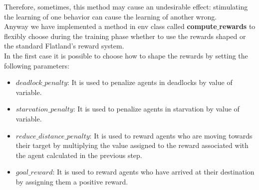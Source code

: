 Therefore, sometimes, this method may cause an undesirable effect: stimulating the learning of one behavior can cause the learning of another wrong. \\
Anyway we have implemented a method in env class called \textbf{compute$\_$rewards} to flexibly choose during the training phase whether to use the rewards shaped or the standard Flatland's reward system. \\
In the first case it is possible to choose how to shape the rewards by setting the following parameters:
\begin{itemize}
	\item\textbf{$deadlock\_penalty$}: It is used to penalize agents in deadlocks by value of variable.
	\item \textbf{$starvation\_penalty$}: It is used to penalize agents in starvation by value of variable.
	\item \textbf{$reduce\_distance\_penalty$}: It is used to reward agents who are moving towards their target by multiplying the value assigned to the reward associated with the agent calculated in the previous step.
	\item \textbf{$goal\_reward$}: It is used to reward agents who have arrived at their destination by assigning them a positive reward.
\end{itemize}
	